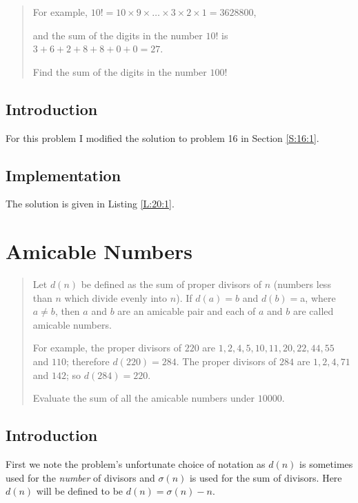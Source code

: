 \documentclass[oneside,12pt]{book}   	%
\newcounter{ex}
\newcounter{def}
\newcounter{pr}
\theoremstyle{definition}
\begin{document}
\begin{spacing}{1.618}
\begin{quote}
			For example, $10!=10\times 9\times \dots \times 3\times 2 \times 1=3628800$,
			
			and the sum of the digits in the number $10!$ is $3+6+2+8+8+0+0=27$. 
			
			Find the sum of the digits in the number $100!$
		\end{quote}
		
		\section{Introduction}
		
			For this problem I modified the solution to problem 16 in Section \ref{S:16:1}. 
			
		\section{Implementation}
		
			The solution is given in Listing \ref{L:20:1}. 
		
			
		
	\chapter{Amicable Numbers}
	
	\begin{quote}
		Let $d(n)$ be defined as the sum of proper divisors of $n$ (numbers less than $n$ which divide evenly into $n$).
		If $d(a) = b$ and $d(b) = $a, where $a\neq b$, then $a$ and $b$ are an amicable pair and each of $a$ and $b$ are called amicable numbers.

		For example, the proper divisors of $220$ are $1, 2, 4, 5, 10, 11, 20, 22, 44, 55$ and $110$; therefore $d(220) = 284$. The proper divisors of $284$ are $1, 2, 4, 71$ and $142$; so $d(284) = 220$.

		Evaluate the sum of all the amicable numbers under $10000$.
	\end{quote}
	
	 \section{Introduction}
	 
	 	First we note the problem's unfortunate choice of notation as $d(n)$ is sometimes used for the \emph{number} of divisors and $\sigma(n)$ is used for the sum of divisors. Here $d(n)$ will be defined to be $d(n)=\sigma(n)-n$. 
	 

\end{spacing}
\end{document}
